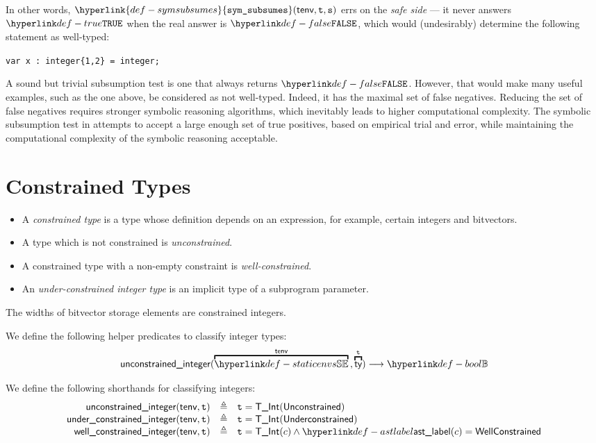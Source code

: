 \documentclass{book}
\newcommand\isunconstrainedinteger[0]{\textsf{unconstrained\_integer}}
\newcommand\isunderconstrainedinteger[0]{\textsf{under\_constrained\_integer}}
\newcommand\iswellconstrainedinteger[0]{\textsf{well\_constrained\_integer}}
\newcommand\symsubsumes[0]{\hyperlink{def-symsubsumes}{\texttt{sym\_subsumes}}}
\newcommand\vt[0]{\texttt{t}}
\newcommand\vs[0]{\texttt{s}}
\begin{document}
In other words, $\symsubsumes(\tenv, \vt, \vs)$ errs on the \emph{safe side} ---
it never answers $\True$ when the real answer is $\False$, which would (undesirably)
determine the following statement as well-typed:
\begin{center}
  \verb|var x : integer{1,2} = integer;|
\end{center}

A sound but trivial subsumption test is one that always returns $\False$.
However, that would make many useful examples, such as the one above,
be considered as not well-typed. Indeed, it has the maximal set of false negatives.
Reducing the set of false negatives requires stronger symbolic reasoning algorithms,
which inevitably leads to higher computational complexity.
%
The symbolic subsumption test in 
attempts to accept a large enough set of true positives, based on empirical trial and error,
while maintaining the computational complexity of the symbolic reasoning acceptable.

\section{Constrained Types}
\begin{itemize}
  \item A \emph{constrained type} is a type whose definition depends on an expression, for example, certain integers and bitvectors.
  \item A type which is not constrained is \emph{unconstrained}.
  \item A constrained type with a non-empty constraint is \emph{well-constrained}.
  \item An \emph{under-constrained integer type} is an implicit type of a subprogram parameter.
  \end{itemize}
The widths of bitvector storage elements are constrained integers.

We define the following helper predicates to classify integer types:
\[
  \isunconstrainedinteger(\overname{\staticenvs}{\tenv} \aslsep \overname{\ty}{\vt}) \aslto \Bool
\]

We define the following shorthands for classifying integers:
\[
  \begin{array}{rcl}
  \isunconstrainedinteger(\tenv, \vt) &\triangleq& \vt = \TInt(\unconstrained)\\
  \isunderconstrainedinteger(\tenv, \vt) &\triangleq& \vt = \TInt(\underconstrained)\\
  \iswellconstrainedinteger(\tenv, \vt) &\triangleq& \vt = \TInt(c) \land \astlabel(c)=\wellconstrained\\
\end{array}
\]
\end{document}
